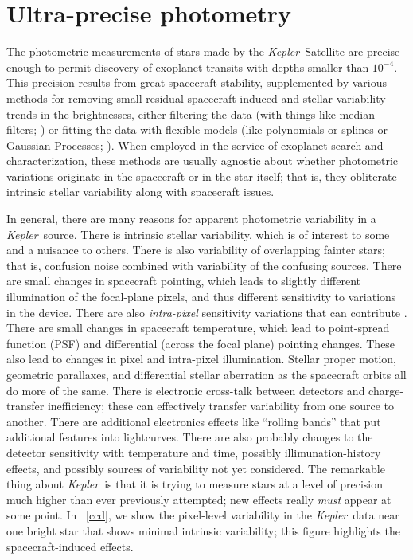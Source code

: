 \documentclass[12pt, preprint]{aastex}
\newcommand{\project}[1]{\textsl{#1}}
\newcommand{\Kepler}{\project{Kepler}}
\begin{document}
\section{Ultra-precise photometry}

The photometric measurements of stars made by the \Kepler\ Satellite are precise enough
  to permit discovery of exoplanet transits with depths smaller than $10^{-4}$.
This precision results from great spacecraft stability,
  supplemented by various methods for removing small residual spacecraft-induced and stellar-variability trends in the brightnesses,
  either filtering the data (with things like median filters; \cite{trendfilter})
  or fitting the data with flexible models (like polynomials or splines or Gaussian Processes; 
  \cite{gaussian}).
When employed in the service of exoplanet search and characterization,
  these methods are usually agnostic about whether photometric variations originate in the spacecraft or in the star itself;
  that is, they obliterate intrinsic stellar variability along with spacecraft issues.

In general, there are many reasons for apparent photometric variability in a \Kepler\ source.
There is intrinsic stellar variability,
  which is of interest to some and a nuisance to others.
There is also variability of overlapping fainter stars;
  that is, confusion noise combined with variability of the confusing sources.
There are small changes in spacecraft pointing,
  which leads to slightly different illumination of the focal-plane pixels,
  and thus different sensitivity to variations in the device.
There are also \emph{intra-pixel} sensitivity variations that can contribute \citep{whitepaper}.
There are small changes in spacecraft temperature,
  which lead to point-spread function (PSF) and differential (across the focal plane) pointing changes.
These also lead to changes in pixel and intra-pixel illumination.
Stellar proper motion, geometric parallaxes, and differential stellar aberration as the spacecraft orbits all do more of the same.
There is electronic cross-talk between detectors and charge-transfer inefficiency;
  these can effectively transfer variability from one source to another.
There are additional electronics effects like ``rolling bands'' that put additional features into lightcurves.
There are also probably changes to the detector sensitivity with temperature and time,
  possibly illimunation-history effects,
  and possibly sources of variability not yet considered.
The remarkable thing about \Kepler\ is that it is trying to measure stars at a level of precision
  much higher than ever previously attempted;
  new effects really \emph{must} appear at some point.
In \figurename~\ref{ccd}, we show the pixel-level variability in the \Kepler\ data
  near one bright star that shows minimal intrinsic variability;
  this figure highlights the spacecraft-induced effects.
\end{document}
